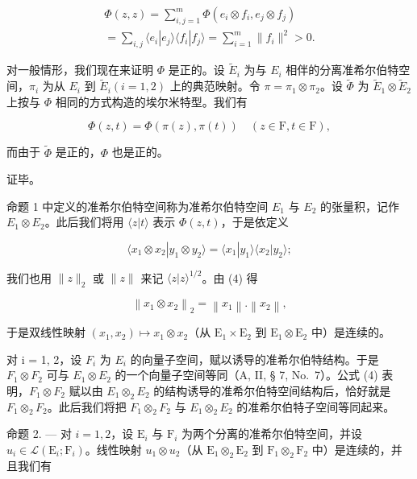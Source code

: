 \[
\begin{array}{l} \Phi (z, z) = \sum_ {i, j = 1} ^ {m} \Phi (e _ {i} \otimes f _ {i}, e _ {j} \otimes f _ {j}) \\ = \sum_ {i, j} \langle e _ {i} | e _ {j} \rangle \langle f _ {i} | f _ {j} \rangle = \sum_ {i = 1} ^ {m} \| f _ {i} \| ^ {2} > 0. \end{array}
\]

对一般情形，我们现在来证明 \(\Phi\) 是正的。设 \(\tilde{E}_{i}\) 为与 \(E_{i}\) 相伴的分离准希尔伯特空间，\(\pi_{i}\) 为从 \(E_{i}\) 到 \(\tilde{E}_{i} (i = 1, 2)\) 上的典范映射。令 \(\pi = \pi_{1} \otimes \pi_{2}\)。设 \(\tilde{\Phi}\) 为 \(\tilde{E}_{1} \otimes \tilde{E}_{2}\) 上按与 \(\Phi\) 相同的方式构造的埃尔米特型。我们有

\[
\Phi (z, t) = \Phi (\pi (z), \pi (t)) \quad (z \in \mathrm{F}, t \in \mathrm{F}),
\]

而由于 \(\tilde{\Phi}\) 是正的，\(\Phi\) 也是正的。

证毕。

命题 1 中定义的准希尔伯特空间称为准希尔伯特空间 \(E_{1}\) 与 \(E_{2}\) 的张量积，记作 \(E_{1} \otimes E_{2}\)。此后我们将用 \(\langle z|t\rangle\) 表示 \(\Phi(z,t)\)，于是依定义

\[
\langle x _ {1} \otimes x _ {2} | y _ {1} \otimes y _ {2} \rangle = \langle x _ {1} | y _ {1} \rangle \langle x _ {2} | y _ {2} \rangle ;\tag{4}
\]

我们也用 \(\| z\| _2\) 或 \(\| z\|\) 来记 \(\langle z|z\rangle^{1 / 2}\)。由 (4) 得

\[
\left\| x _ {1} \otimes x _ {2} \right\| _ {2} = \left\| x _ {1} \right\|. \left\| x _ {2} \right\|,\tag{5}
\]

于是双线性映射 \((x_{1}, x_{2}) \mapsto x_{1} \otimes x_{2}\)（从 \(\mathrm{E}_1 \times \mathrm{E}_2\) 到 \(\mathrm{E}_1 \otimes \mathrm{E}_2\) 中）是连续的。

对 i = 1, 2，设 \(F_{i}\) 为 \(E_{i}\) 的向量子空间，赋以诱导的准希尔伯特结构。于是 \(F_{1} \otimes F_{2}\) 可与 \(E_{1} \otimes E_{2}\) 的一个向量子空间等同（A, II, § 7, No.~7）。公式 (4) 表明，\(F_{1} \otimes F_{2}\) 赋以由 \(E_{1} \otimes_{2} E_{2}\) 的结构诱导的准希尔伯特空间结构后，恰好就是 \(F_{1} \otimes_{2} F_{2}\)。此后我们将把 \(F_{1} \otimes_{2} F_{2}\) 与 \(E_{1} \otimes_{2} E_{2}\) 的准希尔伯特子空间等同起来。

命题 2. --- 对 \(i = 1, 2\)，设 \(\mathrm{E}_{i}\) 与 \(\mathrm{F}_{i}\) 为两个分离的准希尔伯特空间，并设 \(u_{i} \in \mathcal{L}(\mathrm{E}_{i}; \mathrm{F}_{i})\)。线性映射 \(u_{1} \otimes u_{2}\)（从 \(\mathrm{E}_{1} \otimes_{2} \mathrm{E}_{2}\) 到 \(\mathrm{F}_{1} \otimes_{2} \mathrm{F}_{2}\) 中）是连续的，并且我们有

